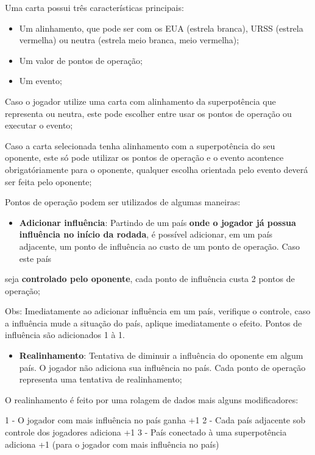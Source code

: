 \documentclass[11pt]{article}
\begin{document}
Uma carta possui três características principais:

\begin{itemize}
\item Um alinhamento, que pode ser com os EUA (estrela branca), URSS (estrela vermelha) ou neutra (estrela meio branca, meio vermelha);

\item Um valor de pontos de operação;

\item Um evento;
\end{itemize}

Caso o jogador utilize uma carta com alinhamento da superpotência que representa ou neutra, este pode escolher entre usar os pontos de operação ou executar o evento;

Caso a carta selecionada tenha alinhamento com a superpotência do seu oponente, este só pode utilizar os pontos de operação e o evento acontence obrigatóriamente para o oponente, qualquer escolha orientada pelo evento
deverá ser feita pelo oponente;

Pontos de operação podem ser utilizados de algumas maneiras:

\begin{itemize}
\item \textbf{Adicionar influência}: Partindo de um país \textbf{onde o jogador já possua influência no início da rodada}, é possível adicionar, em um país adjacente, um ponto de influência ao custo de um ponto de operação. Caso este país
\end{itemize}
seja \textbf{controlado pelo oponente}, cada ponto de influência custa 2 pontos de operação;

Obs: Imediatamente ao adicionar influência em um país, verifique o controle, caso a influência mude a situação do país, aplique imediatamente o efeito. Pontos de influência são adicionados 1 à 1.

\begin{itemize}
\item \textbf{Realinhamento}: Tentativa de diminuir a influência do oponente em algum país. O jogador não adiciona sua influência no país. Cada ponto de operação representa uma tentativa de realinhamento;
\end{itemize}

O realinhamento é feito por uma rolagem de dados mais alguns modificadores:

1 - O jogador com mais influência no país ganha +1
2 - Cada país adjacente sob controle dos jogadores adiciona +1
3 - País conectado à uma superpotência adiciona +1 (para o jogador com mais influência no país)
\end{document}
